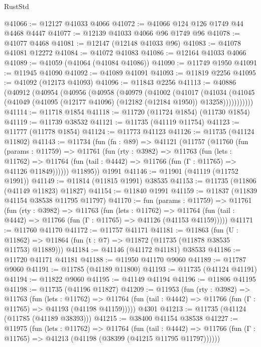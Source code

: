 \begin{lexlean}{RustStd}
\begin{coremodule}
@41066 := @12127 @41033 @4066
@41072 := @41066 @124 @126 @1749 @44 @4468 @4447
@41077 := @12139 @41033 @4066 @96 @1749 @96
@41078 := @41077 @4468
@41081 := @12147 (@12148 @41033 @96)
@41083 := @41078 @41081 @12272
@41084 := @41072 @41083
@41086 := @12164 @41033 @4066
@41089 := @41059 (@41064 (@41084 @41086))
@41090 := @11749 @1950
@41091 := @11945 @41090
@41092 := @41089 @41091
@41093 := @11819 @2256
@41095 := @41092 (@12173 @41093)
@41096 := @11843 @2256
@41113 := @40886
    (@40912
      (@40954
        (@40956
          (@40958
            (@40979
              (@41002
                (@41017
                  (@41034
                    (@41045
                      (@41049 (@41095 (@12177 @41096) (@12182 (@12184 @1950)) @13258)))))))))))
@41114 := @11718 @1854
@41118 := @11720 (@11724 @1854) (@11730 @1854)
@41119 := @11739 @38532
@41121 := @11735 (@41119 @11754)
@41123 := @11777 (@11778 @1854)
@41124 := @11773 @41123
@41126 := @11735 (@41124 @11802)
@41143 := @11734
    (fun (fn : @89) =>
    @41121
      (@11757
        (@11760
          (fun (params : @11759) =>
          @11761
            (fun (rty : @3982) =>
            @11763
              (fun (lets : @11762) =>
              @11764 (fun (tail : @4442) => @11766 (fun (Γ : @11765) => @41126 @11849))))))
        @11895))
    @1991
@41146 := @11901 (@41119 (@11752 @1991))
@41149 := @11814 (@11815 @1991) @38535
@41153 := @11735 (@11806 (@41149 @11823) @11827)
@41154 := @11840 @1991
@41159 := @11837 (@11839 @41154 @38538 @11795 @11797)
@41170 := fun (params : @11759) =>
  @11761
    (fun (rty : @3982) =>
    @11763
      (fun (lets : @11762) =>
      @11764 (fun (tail : @4442) => @11766 (fun (Γ : @11765) => @41126 (@41153 @41159)))))
@41171 := @11760 @41170
@41172 := @11757 @41171
@41181 := @11863
    (fun (U : @11862) => @11864 (fun (t : @7) => @11872 (@11735 (@11878 @38535 @11753) @11889)))
@41184 := @41146 (@41172 @41181) @38533
@41186 := @11720 @41171 @41181
@41188 := @11950 @41170 @9060
@41189 := @11787 @9060
@41191 := @11785 (@41189 @11800)
@41193 := @11735 (@41124 @41191)
@41194 := @11822 @9060
@41195 := @41149 @41194
@41196 := @11806 @41195
@41198 := @11735 (@41196 @11827)
@41209 := @11953
    (fun (rty : @3982) =>
    @11763
      (fun (lets : @11762) =>
      @11764 (fun (tail : @4442) => @11766 (fun (Γ : @11765) => @41193 (@41198 @41159)))))
    @4301
@41213 := @11735 (@41124 (@11785 (@41189 @38393)))
@41215 := @38400 @41154 @38538
@41227 := @11975
    (fun (lets : @11762) =>
    @11764
      (fun (tail : @4442) =>
      @11766 (fun (Γ : @11765) => @41213 (@41198 (@38399 (@41215 @11795 @11797))))))

\end{coremodule}
\end{lexlean}
